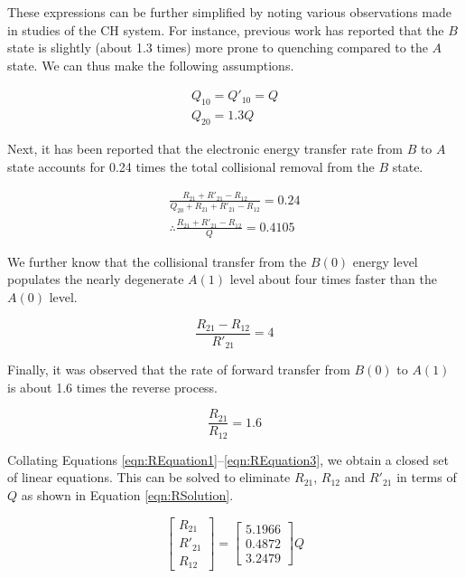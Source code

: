 These expressions can be further simplified by noting various observations made in studies of the CH system.
For instance, previous work\cite{1984-cool,1985-garland-b} has reported that the \(B\) state is slightly (about 1.3 times) more prone to quenching compared to the \(A\) state.
We can thus make the following assumptions.

\begin{gather}
  Q_{10} = Q'_{10} = Q
  \label{eqn:quenchingAssumption1}\\
  Q_{20} = 1.3Q
  \label{eqn:quenchingAssumption2}
\end{gather}

Next, it has been reported\cite{2000-luque} that the electronic energy transfer rate from \(B\) to \(A\) state accounts for 0.24 times the total collisional removal from the \(B\) state.

\begin{gather}
  \frac{ R_{21} + R'_{21} - R_{12} }{ Q_{20} + R_{21} + R'_{21} - R_{12} } = 0.24\\
  \therefore \frac{ R_{21} + R'_{21} - R_{12} }{ Q } = 0.4105
  \label{eqn:REquation1}
\end{gather}

We further know\cite{1985-garland-b, 2000-luque} that the collisional transfer from the \(B(0)\) energy level populates the nearly degenerate \(A(1)\) level about four times faster than the \(A(0)\) level.

\begin{equation}
  \frac{ R_{21} - R_{12} }{ R'_{21} } = 4
  \label{eqn:REquation2}
\end{equation}

Finally, it was observed\cite{1985-garland-b} that the rate of forward transfer from \(B(0)\) to \(A(1)\) is about 1.6 times the reverse process.

\begin{equation}
  \frac{R_{21}}{R_{12}} = 1.6
  \label{eqn:REquation3}
\end{equation}

Collating Equations \ref{eqn:REquation1}--\ref{eqn:REquation3}, we obtain a closed set of linear equations.
This can be solved to eliminate \(R_{21}\), \(R_{12}\) and \(R'_{21}\) in terms of \(Q\) as shown in Equation \ref{eqn:RSolution}.

\begin{equation}
  \left[
    \begin{matrix}
      R_{21}\\
      R'_{21}\\
      R_{12}
    \end{matrix}
  \right] = \left[
    \begin{matrix}
      5.1966\\
      0.4872\\
      3.2479
    \end{matrix}
  \right] Q
  \label{eqn:RSolution}
\end{equation}

